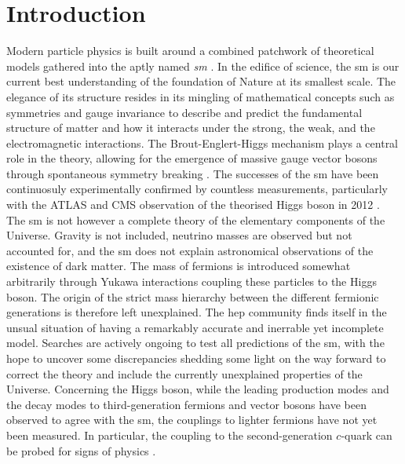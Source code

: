 \chapter{\color{oxfordblue} Introduction}
\ChapFrame

Modern particle physics is built around a combined patchwork of theoretical models gathered into the aptly named \textit{\gls{sm}} \cite{Schwartz_2013, SMphysics}. In the edifice of science, the \gls{sm} is our current best understanding of the foundation of Nature at its smallest scale. The elegance of its structure resides in its mingling of mathematical concepts such as symmetries and gauge invariance to describe and predict the fundamental structure of matter and how it interacts under the strong, the weak, and the electromagnetic interactions. The Brout-Englert-Higgs mechanism plays a central role in the theory, allowing for the emergence of massive gauge vector bosons through spontaneous symmetry breaking \cite{Englert:1964et,  PhysRevLett.13.508}. The successes of the \gls{sm} have been continuosuly experimentally confirmed by countless measurements, particularly with the ATLAS and CMS observation of the theorised Higgs boson in 2012 \cite{ATLAS:2012yve, CMS:2012qbp}. The \gls{sm} is not however a complete theory of the elementary components of the Universe. Gravity is not included, neutrino masses are observed but not accounted for, and the \gls{sm} does not explain astronomical observations of the existence of dark matter. The mass of fermions is introduced somewhat arbitrarily through Yukawa interactions coupling these particles to the Higgs boson. The origin of the strict mass hierarchy between the different fermionic generations is therefore left unexplained. The \gls{hep} community finds itself in the unsual situation of having a remarkably accurate and inerrable yet incomplete model. Searches are actively ongoing to test all predictions of the \gls{sm}, with the hope to uncover some discrepancies shedding some light on the way forward to correct the theory and include the currently unexplained properties of the Universe. Concerning the Higgs boson, while the leading production modes and the decay modes to third-generation fermions and vector bosons have been observed to agree with the \gls{sm}, the couplings to lighter fermions have not yet been measured. In particular, the coupling to the second-generation $c$-quark can be probed for signs of physics  \cite{PhysRevD.89.033014,PhysRevD.92.033016,Botella:2016krk,PhysRevD.98.055001,GHOSH2016504,PhysRevLett.123.031802,PhysRevD.100.115041}. \\

